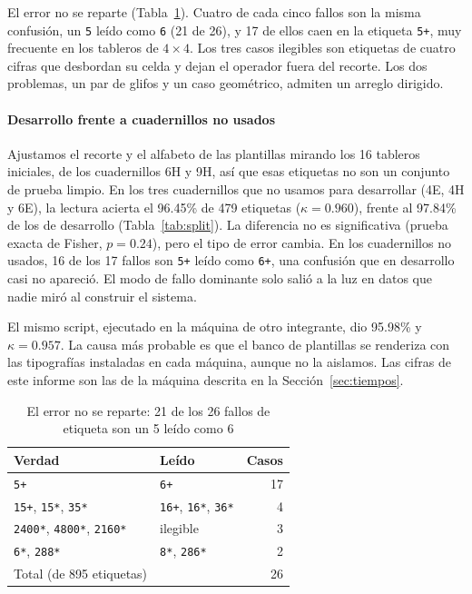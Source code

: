 \documentclass[conference]{IEEEtran}
\begin{document}
El error no se reparte (Tabla~\ref{tab:confusiones}). Cuatro de cada cinco fallos son la misma confusión, un \texttt{5} leído como \texttt{6} (21 de 26), y 17 de ellos caen en la etiqueta \texttt{5+}, muy frecuente en los tableros de $4 \times 4$. Los tres casos ilegibles son etiquetas de cuatro cifras que desbordan su celda y dejan el operador fuera del recorte. Los dos problemas, un par de glifos y un caso geométrico, admiten un arreglo dirigido.

\paragraph{Desarrollo frente a cuadernillos no usados}
Ajustamos el recorte y el alfabeto de las plantillas mirando los 16 tableros iniciales, de los cuadernillos 6H y 9H, así que esas etiquetas no son un conjunto de prueba limpio. En los tres cuadernillos que no usamos para desarrollar (4E, 4H y 6E), la lectura acierta el 96.45\% de 479 etiquetas ($\kappa = 0.960$), frente al 97.84\% de los de desarrollo (Tabla~\ref{tab:split}). La diferencia no es significativa (prueba exacta de Fisher, $p = 0.24$), pero el tipo de error cambia. En los cuadernillos no usados, 16 de los 17 fallos son \texttt{5+} leído como \texttt{6+}, una confusión que en desarrollo casi no apareció. El modo de fallo dominante solo salió a la luz en datos que nadie miró al construir el sistema.


El mismo script, ejecutado en la máquina de otro integrante, dio 95.98\% y $\kappa = 0.957$. La causa más probable es que el banco de plantillas se renderiza con las tipografías instaladas en cada máquina, aunque no la aislamos. Las cifras de este informe son las de la máquina descrita en la Sección~\ref{sec:tiempos}.

\begin{table}[t]
\caption{El error no se reparte: 21 de los 26 fallos de etiqueta son un 5 leído como 6}
\label{tab:confusiones}
\centering
\begin{tabular}{llr}
\toprule
Verdad & Leído & Casos \\
\midrule
\texttt{5+} & \texttt{6+} & 17 \\
\texttt{15+}, \texttt{15*}, \texttt{35*} & \texttt{16+}, \texttt{16*}, \texttt{36*} & 4 \\
\texttt{2400*}, \texttt{4800*}, \texttt{2160*} & ilegible & 3 \\
\texttt{6*}, \texttt{288*} & \texttt{8*}, \texttt{286*} & 2 \\
\midrule
Total (de 895 etiquetas) & & 26 \\
\bottomrule
\end{tabular}
\end{table}
\end{document}
